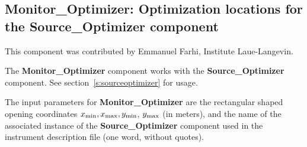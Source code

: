 
\subsection{Monitor\_Optimizer: Optimization locations for the
  Sour\-ce\_Op\-ti\-miz\-er component}
\label{s:monitoroptimizer}

This component was contributed by Emmanuel Farhi, Institute
Laue-Langevin.

The {\bf Monitor\_Optimizer} component works with the {\bf
  Source\_Optimizer} component. See section~\ref{s:sourceoptimizer}
for usage.

The input parameters for {\bf Monitor\_Optimizer} are the rectangular
shaped opening coordinates $x_{\rm min}, x_{\rm max}, y_{\rm min}$,
$y_{\rm max}$ (in meters), and the name of the associated instance of
the {\bf
  Source\_Optimizer} component used in the instrument description file (one word,
without quotes).
